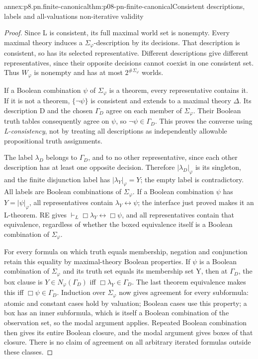 \begin{annexitem}{annex:p8.pn.finite-canonical}{thm:p08-pn-finite-canonical}{Consistent descriptions, labels and all-valuations non-iterative validity}
\begin{proof}
Since L is consistent, its full maximal world set is nonempty.
Every maximal theory induces a \(\Sigma_\varphi\)-description
by its decisions. That description is consistent, so has its
selected representative. Different descriptions give different
representatives, since their opposite decisions cannot coexist
in one consistent set. Thus \(W_\varphi\) is nonempty and
has at most \(2^{\#\Sigma_\varphi}\) worlds.

If a Boolean combination \(\psi\) of \(\Sigma_\varphi\)
is a theorem, every representative contains it. If it is not a
theorem, \(\{\neg\psi\}\) is consistent and extends to a
maximal theory \(\Delta\). Its description D and the chosen
\(\Gamma_D\) agree on each member of \(\Sigma_\varphi\).
Their Boolean truth tables consequently agree on \(\psi\),
so \(\neg\psi\in\Gamma_D\). This proves the converse
using \emph{L-consistency}, not by treating all descriptions as
independently allowable propositional truth assignments.

The label \(\lambda_D\) belongs to \(\Gamma_D\), and to
no other representative, since each other description has at least
one opposite decision. Therefore \(|\lambda_D|_\varphi\)
is its singleton, and the finite disjunction label has
\(|\lambda_Y|_\varphi=Y\); the empty label is contradictory.
All labels are Boolean combinations of \(\Sigma_\varphi\).
If a Boolean combination \(\psi\) has
\(Y=|\psi|_\varphi\), all representatives contain
\(\lambda_Y\leftrightarrow\psi\); the interface just
proved makes it an L-theorem. RE gives
\(\vdash_L\Box\lambda_Y\leftrightarrow\Box\psi\),
and all representatives contain that equivalence, regardless of
whether the boxed equivalence itself is a Boolean combination
of \(\Sigma_\varphi\).

For every formula on which truth equals membership, negation
and conjunction retain this equality by maximal-theory Boolean
properties. If \(\psi\) is a Boolean combination of
\(\Sigma_\varphi\) and its truth set equals its membership
set Y, then at \(\Gamma_D\), the box clause is
\(Y\in N_\varphi(\Gamma_D)\) iff
\(\Box\lambda_Y\in\Gamma_D\). The last theorem
equivalence makes this iff \(\Box\psi\in\Gamma_D\).
Induction over \(\Sigma_\varphi\) now gives agreement for
every subformula: atomic and constant cases hold by valuation;
Boolean cases use this property; a box has an inner subformula,
which is itself a Boolean combination of the observation set,
so the modal argument applies. Repeated Boolean combination
then gives its entire Boolean closure, and the modal argument
gives boxes of that closure. There is no claim of agreement on
all arbitrary iterated formulas outside these classes.


\end{proof}
\end{annexitem}
